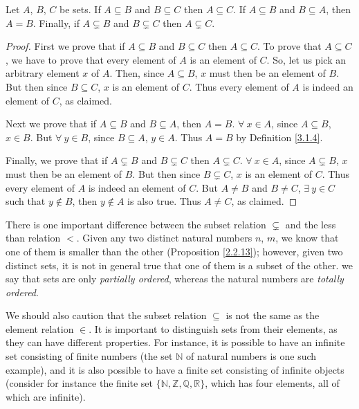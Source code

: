 \begin{proposition}\label{3.1.18}
Let \(A\), \(B\), \(C\) be sets.
If \(A \subseteq B\) and \(B \subseteq C\) then \(A \subseteq C\).
If \(A \subseteq B\) and \(B \subseteq A\), then \(A = B\).
Finally, if \(A \subsetneq B\) and \(B \subsetneq C\) then \(A \subsetneq C\).
\end{proposition}

\begin{proof}
First we prove that if \(A \subseteq B\) and \(B \subseteq C\) then \(A \subseteq C\).
To prove that \(A \subseteq C\), we have to prove that every element of \(A\) is an element of \(C\).
So, let us pick an arbitrary element \(x\) of \(A\).
Then, since \(A \subseteq B\), \(x\) must then be an element of \(B\).
But then since \(B \subseteq C\), \(x\) is an element of \(C\).
Thus every element of \(A\) is indeed an element of \(C\), as claimed.

Next we prove that if \(A \subseteq B\) and \(B \subseteq A\), then \(A = B\).
\(\forall\ x \in A\), since \(A \subseteq B\), \(x \in B\).
But \(\forall\ y \in B\), since \(B \subseteq A\), \(y \in A\).
Thus \(A = B\) by Definition \ref{3.1.4}.

Finally, we prove that if \(A \subsetneq B\) and \(B \subsetneq C\) then \(A \subsetneq C\).
\(\forall\ x \in A\), since \(A \subsetneq B\), \(x\) must then be an element of \(B\).
But then since \(B \subsetneq C\), \(x\) is an element of \(C\).
Thus every element of \(A\) is indeed an element of \(C\).
But \(A \neq B\) and \(B \neq C\), \(\exists\ y \in C\) such that \(y \notin B\), then \(y \notin A\) is also true.
Thus \(A \neq C\), as claimed.
\end{proof}

\setcounter{theorem}{19}
\begin{remark}\label{3.1.20}
There is one important difference between the subset relation \(\subsetneq\) and the less than relation \(<\).
Given any two distinct natural numbers \(n\), \(m\), we know that one of them is smaller than the other (Proposition \ref{2.2.13});
however, given two distinct sets, it is not in general true that one of them is a subset of the other.
we say that sets are only \emph{partially ordered}, whereas the natural numbers are \emph{totally ordered}.
\end{remark}

\begin{remark}\label{3.1.21}
We should also caution that the subset relation \(\subseteq\) is not the same as the element relation \(\in\).
It is important to distinguish sets from their elements, as they can have different properties.
For instance, it is possible to have an infinite set consisting of finite numbers (the set \(\mathds{N}\) of natural numbers is one such example), and it is also possible to have a finite set consisting of infinite objects (consider for instance the finite set \(\{\mathds{N}, \mathds{Z}, \mathds{Q}, \mathds{R}\}\), which has four elements, all of which are infinite).
\end{remark}

